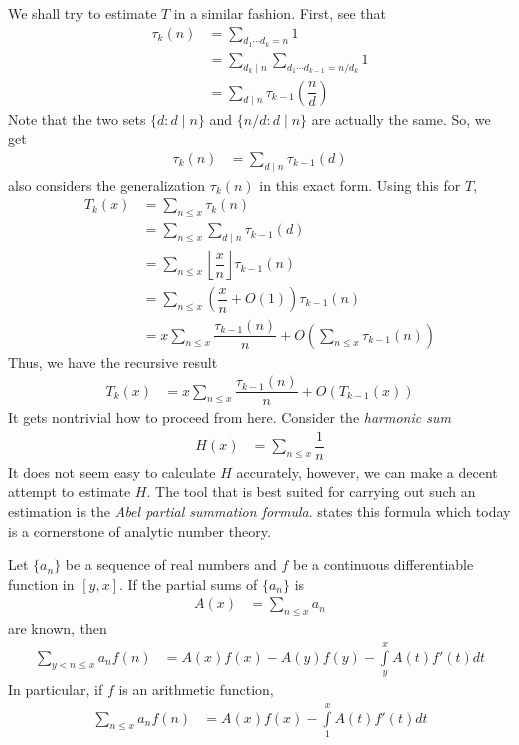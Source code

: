 \documentclass[elemannt.tex]{subfile}
\begin{document}
	We shall try to estimate $T$ in a similar fashion. First, see that
		\begin{align*}
			\tau_{k}(n)
				& = \sum_{d_{1}\cdots d_{k}=n}1\\
				& = \sum_{d_{k}\mid n}\sum_{d_{1}\cdots d_{k-1}=n/d_{k}}1\\
				& = \sum_{d\mid n}\tau_{k-1}\left(\dfrac{n}{d}\right)
		\end{align*}
	Note that the two sets $\{d:d\mid n\}$ and $\{n/d:d\mid n\}$ are actually the same. So, we get
		\begin{align*}
			\tau_{k}(n)
				& = \sum_{d\mid n}\tau_{k-1}(d)
		\end{align*}
	\textcite[($\S$8)]{beumer_1962} also considers the generalization $\tau_{k}(n)$ in this exact form. Using this for $T$,
		\begin{align*}
			T_{k}(x)
				& = \sum_{n\leq x}\tau_{k}(n)\\
				& = \sum_{n\leq x}\sum_{d\mid n}\tau_{k-1}(d)\\
				& = \sum_{n\leq x}\left\lfloor{\dfrac{x}{n}}\right\rfloor\tau_{k-1}(n)\\
				& = \sum_{n\leq x}\left(\dfrac{x}{n}+O(1)\right)\tau_{k-1}(n)\\
				& = x\sum_{n\leq x}\dfrac{\tau_{k-1}(n)}{n}+O\left(\sum_{n\leq x}\tau_{k-1}(n)\right)
		\end{align*}
	Thus, we have the recursive result
		\begin{align*}
			T_{k}(x)
				& = x\sum_{n\leq x}\dfrac{\tau_{k-1}(n)}{n}+O(T_{k-1}(x))
		\end{align*}
	It gets nontrivial how to proceed from here. Consider the \textit{harmonic sum}
		\begin{align*}
			H(x)
			& = \sum_{n\leq x}\dfrac{1}{n}
		\end{align*}
	It does not seem easy to calculate $H$ accurately, however, we can make a decent attempt to estimate $H$. The tool that is best suited for carrying out such an estimation is the \textit{Abel partial summation formula}. \textcite{abel_1826} states this formula which today is a cornerstone of analytic number theory.
		\begin{theorem}\label{thm:abel}
			Let $\{a_{n}\}$ be a sequence of real numbers and $f$ be a continuous differentiable function in $[y,x]$. If the partial sums of $\{a_{n}\}$ is
				\begin{align*}
					A(x)
						& = \sum_{n\leq x}a_{n}
				\end{align*}
			are known, then
				\begin{align*}
					\sum_{y<n\leq x}a_{n}f(n)
						& = A(x)f(x)-A(y)f(y)-\int\limits_{y}^{x}A(t)f'(t)dt
				\end{align*}
			In particular, if $f$ is an arithmetic function,
				\begin{align*}
					\sum_{n\leq x}a_{n}f(n)
						& = A(x)f(x)-\int\limits_{1}^{x}A(t)f'(t)dt
				\end{align*}
		\end{theorem}
\end{document}
